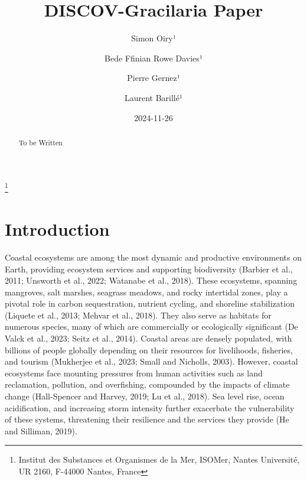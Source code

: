 \documentclass[
  letterpaper,
  DIV=11,
  numbers=noendperiod]{scrartcl}
\title{DISCOV-Gracilaria Paper}
\author{Simon Oiry¹ \and Bede Ffinian Rowe Davies¹ \and Pierre
Gernez¹ \and Laurent Barillé¹}
\date{2024-11-26}
\begin{document}
\maketitle
\begin{abstract}
To be Written
\end{abstract}


\footnote{Institut des Substances et Organismes de la Mer, ISOMer,
  Nantes Université, UR 2160, F-44000 Nantes, France}

\section{Introduction}\label{introduction}

Coastal ecosystems are among the most dynamic and productive
environments on Earth, providing ecosystem services and supporting
biodiversity (Barbier et al., 2011; Unsworth et al., 2022; Watanabe et
al., 2018). These ecosystems, spanning mangroves, salt marshes, seagrass
meadows, and rocky intertidal zones, play a pivotal role in carbon
sequestration, nutrient cycling, and shoreline stabilization (Liquete et
al., 2013; Mehvar et al., 2018). They also serve as habitats for
numerous species, many of which are commercially or ecologically
significant (De Valck et al., 2023; Seitz et al., 2014). Coastal areas
are densely populated, with billions of people globally depending on
their resources for livelihoods, fisheries, and tourism (Mukherjee et
al., 2023; Small and Nicholls, 2003). However, coastal ecosystems face
mounting pressures from human activities such as land reclamation,
pollution, and overfishing, compounded by the impacts of climate change
(Hall-Spencer and Harvey, 2019; Lu et al., 2018). Sea level rise, ocean
acidification, and increasing storm intensity further exacerbate the
vulnerability of these systems, threatening their resilience and the
services they provide (He and Silliman, 2019).
\end{document}
